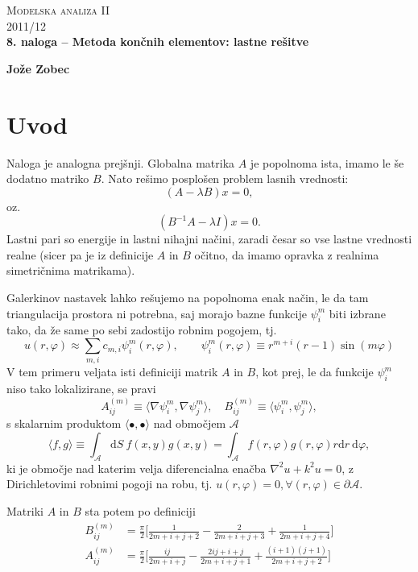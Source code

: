 \documentclass[a4 paper, 12pt]{article}
\renewcommand{\d}{
	\ensuremath{\mathrm{d}}
}
\begin{document}
\begin{center}
\textsc{Modelska analiza II}\\
\textsc{2011/12}\\[0.5cm]
\textbf{8. naloga -- Metoda kon\v cnih elementov: lastne re\v sitve}
\end{center}
\begin{flushright}
\textbf{Jože Zobec}\\
\end{flushright}

\section{Uvod}

Naloga je analogna prej\v snji. Globalna matrika $A$ je popolnoma ista, imamo le \v se dodatno matriko
$B$. Nato re\v simo posplo\v sen problem lasnih vrednosti:
\[
	(A - \lambda B) x = 0,
\]
oz.
\[
	(B^{-1}A - \lambda I) x = 0.
\]
Lastni pari so energije in lastni nihajni na\v cini, zaradi \v cesar so vse lastne vrednosti realne
(sicer pa je iz definicije $A$ in $B$ o\v citno, da imamo opravka z realnima simetri\v cnima
matrikama).

Galerkinov nastavek lahko re\v sujemo na popolnoma enak na\v cin, le da tam triangulacija prostora
ni potrebna, saj morajo bazne funkcije $\psi^m_i$ biti izbrane tako, da \v ze same po sebi zadostijo
robnim pogojem, tj.
\[
	u (r, \varphi) \approx \sum_{m, i} c_{m,i} \psi^m_i (r, \varphi), \qquad \psi^m_i (r, \varphi)
		\equiv r^{m + i} (r - 1) \sin (m\varphi)
\]
V tem primeru veljata isti definiciji matrik $A$ in $B$, kot prej, le da funkcije $\psi^m_i$ niso tako
lokalizirane, se pravi
\[
	A^{(m)}_{ij} \equiv \langle \nabla \psi^m_i, \nabla \psi^m_j \rangle, \quad
	B^{(m)}_{ij} \equiv \langle \psi^m_i, \psi^m_j \rangle,
\]
s skalarnim produktom $\langle \bullet, \bullet \rangle$ nad obmo\v cjem $\mathcal{A}$
\[
	\langle f, g \rangle \equiv \int_\mathcal{A} \d S\ f(x,y) g(x,y) =
		\int_\mathcal{A} f(r,\varphi) g(r, \varphi) r \d r\ \d\varphi,
\]
ki je obmo\v cje nad katerim velja diferencialna ena\v cba $\nabla^2 u + k^2 u = 0$, z
Dirichletovimi robnimi pogoji na robu, tj. $u (r,\varphi) = 0, \forall (r, \varphi) \in
\partial\mathcal{A}$.

Matriki $A$ in $B$ sta potem po definiciji
\begin{align}
	B^{(m)}_{ij} &= \frac{\pi}{2}\bigg[\frac{1}{2m + i + j + 2} - \frac{2}{2m + i + j + 3} +
		\frac{1}{2m + i + j + 4}\bigg] \\
	A^{(m)}_{ij} &= \frac{\pi}{2} \bigg[\frac{ij}{2m + i + j} - \frac{2ij + i + j}{2m + i + j + 1} +
		\frac{(i + 1)(j + 1)}{2m + i + j + 2}\bigg]
\end{align}
\end{document}
